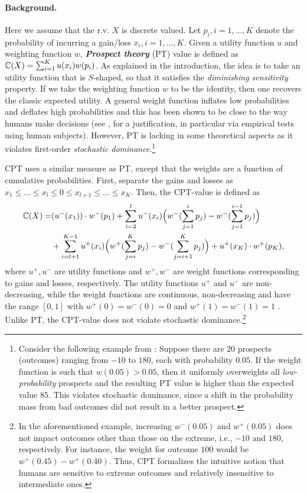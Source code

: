 \paragraph{Background.}
Here we assume that the r.v. $X$ is discrete valued.
Let $p_i, i=1,\ldots,K$ denote the probability of incurring a gain/loss $x_i, i=1,\ldots,K$. %
Given a utility function $u$ and weighting function $w$, \textit{\textbf{Prospect theory}} (PT) value is defined as $\mathbb{C}(X) = \sum_{i=1}^K u(x_i) w(p_i)$. 
As explained in the introduction, the idea is to take an utility function that is $S$-shaped, so that it satisfies the \textit{diminishing sensitivity}  property. 
If we take the weighting function $w$ to be the identity, then one recovers the classic expected utility. A general weight function inflates low probabilities and deflates high probabilities and this has been shown to be close to the way humans make decisions (see \cite{kahneman1979prospect}, \cite{fennema1997original} for a justification, in particular via empirical tests using human subjects).
However, PT is lacking in some theoretical aspects as it violates first-order \textit{stochastic dominance}.\footnote{Consider the following example from \cite{fennema1997original}: Suppose there are $20$ prospects (outcomes) ranging from $-10$ to $180$, each with probability $0.05$. If the weight function is such that $w(0.05) > 0.05$, then it uniformly overweights all \textit{low-probability} prospects and the resulting PT value is higher than the expected value $85$. This violates stochastic dominance, since a shift in the probability mass from bad outcomes did not result in a better prospect.}

CPT uses a similar measure as PT, except that the weights are a function of cumulative probabilities. First, separate the gains and losses as 
$x_1\le \ldots \le x_l \le 0 \le x_{l+1} \le \ldots \le x_K$. Then, the CPT-value is defined as 
\begin{align}
\label{eq:cpt-discrete}
\mathbb{C}(X) = &(u^-(x_1))\cdot w^-(p_1) 
+\sum_{i=2}^l u^-(x_i) \Big(w^-(\sum_{j=1}^i p_j) - w^-(\sum_{j=1}^{i-1} p_j)\Big) 
\\&
 + \sum_{i=l+1}^{K-1} u^+(x_i) \Big(w^+(\sum_{j=i}^K p_j) - w^-(\sum_{j=i+1}^K p_j) \Big)
 + u^+(x_K)\cdot w^+(p_K), 
\end{align} 
where $u^+, u^-$ are utility functions and $w^+, w^-$ are weight functions corresponding to gains and losses, respectively. The utility functions $u^+$ and $u^-$ are non-decreasing, while the weight functions are continuous, non-decreasing and have the range $[0,1]$ with $w^+(0)=w^-(0)=0$ and $w^+(1)=w^-(1)=1$ . 
Unlike PT, the CPT-value does not violate stochastic dominance.\footnote{In the aforementioned example, increasing $w^-(0.05)$ and $w^+(0.05)$ does not impact outcomes other than those on the extreme, i.e., $-10$ and $180$, respectively. For instance, the weight for outcome $100$ would be $w^+(0.45) - w^+(0.40)$. Thus, CPT formalizes the intuitive notion that humans are sensitive to extreme outcomes and relatively insensitive to intermediate ones.}

